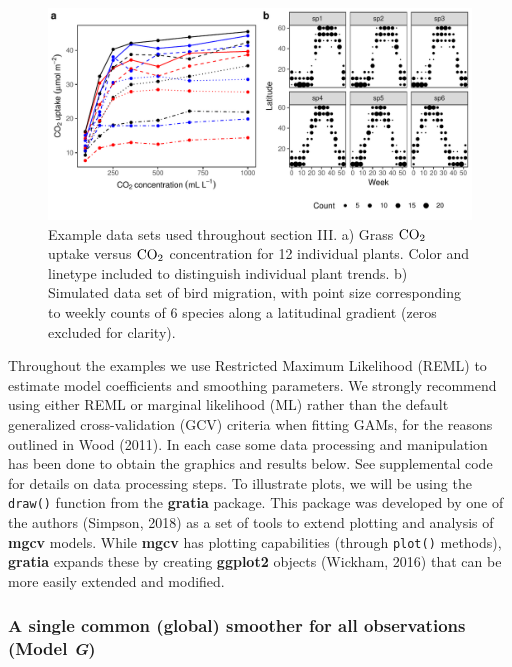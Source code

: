 \documentclass[12pt]{article}
\begin{document}
\begin{figure}
\includegraphics[width=\linewidth]{../figures/Fig5} \caption{\label{fig:Fig5}Example data sets used throughout section III. a) Grass $\text{CO}\textsubscript{2}$ uptake versus $\text{CO}\textsubscript{2}$ concentration for 12 individual plants. Color and linetype included to distinguish individual plant trends. b) Simulated data set of bird migration, with point size corresponding to weekly counts of 6 species along a latitudinal gradient (zeros excluded for clarity). }\label{fig:Fig5}
\end{figure}

Throughout the examples we use Restricted Maximum Likelihood (REML) to
estimate model coefficients and smoothing parameters. We strongly
recommend using either REML or marginal likelihood (ML) rather than the
default generalized cross-validation (GCV) criteria when fitting GAMs,
for the reasons outlined in Wood (2011). In each case some data
processing and manipulation has been done to obtain the graphics and
results below. See supplemental code for details on data processing
steps. To illustrate plots, we will be using the \texttt{draw()}
function from the \textbf{gratia} package. This package was developed by
one of the authors (Simpson, 2018) as a set of tools to extend plotting
and analysis of \textbf{mgcv} models. While \textbf{mgcv} has plotting
capabilities (through \texttt{plot()} methods), \textbf{gratia} expands
these by creating \textbf{ggplot2} objects (Wickham, 2016) that can be
more easily extended and modified.

\subsubsection{\texorpdfstring{A single common (global) smoother for all
observations (Model
\emph{G})}{A single common (global) smoother for all observations (Model G)}}\label{a-single-common-global-smoother-for-all-observations-model-g}
\end{document}
